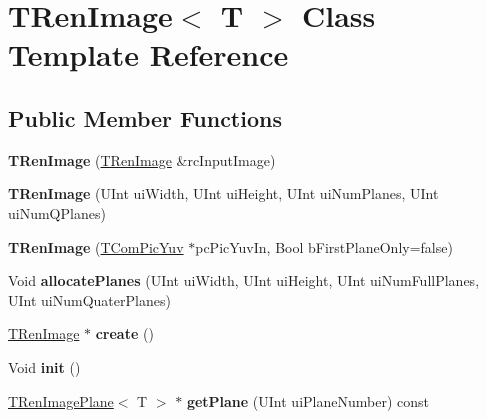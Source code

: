 \hypertarget{class_t_ren_image}{}\section{T\+Ren\+Image$<$ T $>$ Class Template Reference}
\label{class_t_ren_image}
\subsection*{Public Member Functions}
\begin{DoxyCompactItemize}
\item 
\mbox{\label{class_t_ren_image_a43a987cdb83ddc3cca0f8c775e1fbecf}} 
{\bfseries T\+Ren\+Image} (\hyperlink{class_t_ren_image}{T\+Ren\+Image} \&rc\+Input\+Image)
\item 
\mbox{\label{class_t_ren_image_aca7a826a2cda0f0e779cbd3e51f66189}} 
{\bfseries T\+Ren\+Image} (U\+Int ui\+Width, U\+Int ui\+Height, U\+Int ui\+Num\+Planes, U\+Int ui\+Num\+Q\+Planes)
\item 
\mbox{\label{class_t_ren_image_adafb56091124eaaadbb13ffb9318e47f}} 
{\bfseries T\+Ren\+Image} (\hyperlink{class_t_com_pic_yuv}{T\+Com\+Pic\+Yuv} $\ast$pc\+Pic\+Yuv\+In, Bool b\+First\+Plane\+Only=false)
\item 
\mbox{\label{class_t_ren_image_aaf82980b6bbc049d054ab43e271c8ea7}} 
Void {\bfseries allocate\+Planes} (U\+Int ui\+Width, U\+Int ui\+Height, U\+Int ui\+Num\+Full\+Planes, U\+Int ui\+Num\+Quater\+Planes)
\item 
\mbox{\label{class_t_ren_image_ae501375f937ee53f02752cff32261a7f}} 
\hyperlink{class_t_ren_image}{T\+Ren\+Image} $\ast$ {\bfseries create} ()
\item 
\mbox{\label{class_t_ren_image_a0183d37f0b02b786df81ecfd1db67861}} 
Void {\bfseries init} ()
\item 
\mbox{\label{class_t_ren_image_aa5fb543f063a59750f46c2bbf51c5424}} 
\hyperlink{class_t_ren_image_plane}{T\+Ren\+Image\+Plane}$<$ T $>$ $\ast$ {\bfseries get\+Plane} (U\+Int ui\+Plane\+Number) const
\item 

\end{DoxyCompactItemize}
